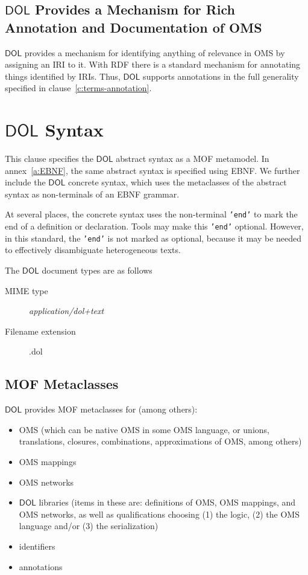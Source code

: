 \documentclass[10pt,fleqn,final]{scrreprt}
\newcommand{\red}[1]{#1} %
\newcommand*{\mimetype}[1]{\textit{#1}}
\newcommand*{\syntax}[1]{\texttt{#1}}
\newcommand*{\DOL}{\ensuremath{\mathsf{DOL}}\xspace}
\newcommand{\clauserefname}{clause}
\newcommand{\cref}[1]{\clauserefname~\ref{#1}}
\newcommand{\clause}[1]{\chapter{#1}}
\newcommand{\sclause}[1]{\section{#1}}
\newenvironment{definitions}[0]{\medskip }{}
\begin{document}
\begin{definitions}
\section{\DOL Provides a Mechanism for Rich Annotation and Documentation of OMS}\label{c:req:annotation}

\DOL provides a mechanism for identifying anything of relevance in OMS by assigning an IRI to it.  With RDF there is a standard mechanism for annotating things identified by IRIs.  Thus, \DOL supports  annotations in the full generality specified in \cref{c:terms-annotation}.




\clause{\DOL  Syntax}\label{c:abstract-syntax}%


This clause specifies the \DOL abstract syntax as a MOF metamodel.
In annex~\ref{a:EBNF}, the same abstract syntax is specified using EBNF.
We further include  the \DOL concrete syntax, which
uses the metaclasses of the abstract syntax as non-terminals of
an EBNF grammar.


At several places, the concrete syntax uses the non-terminal
\syntax{'end'} to mark the end of a definition or declaration. Tools
may make this \syntax{'end'} optional. However, in this standard,
the \syntax{'end'} is not marked as optional, because it may be needed to effectively
disambiguate heterogeneous texts.


\medskip
The \DOL document types are as follows
		\begin{description}
			\item[MIME type] \mimetype{application/dol+text}
			\item[Filename extension] .dol
		\end{description}


\sclause{MOF Metaclasses}
\label{s:mof-metaclasses}

\DOL provides MOF metaclasses for (among others):   
\begin{itemize}
\item OMS (which can be native OMS in some OMS language, or unions, translations,  closures, combinations, approximations of OMS, among others)
\item OMS mappings 
\item OMS networks
\item \DOL libraries (items in these are: definitions of OMS, OMS mappings, and OMS networks, as well as qualifications choosing (1) the logic,
(2) the OMS language and/or (3) the serialization)
\item identifiers
\item annotations
\end{itemize}
 

\end{definitions}
\end{document}

